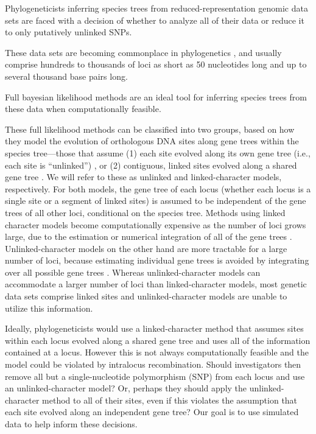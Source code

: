 Phylogeneticists inferring species trees from reduced-representation genomic 
data sets are faced with a decision of whether to analyze all of their data or 
reduce it to only putatively unlinked SNPs.

These data sets are becoming commonplace in phylogenetics \citep{Leache2017}, and
usually comprise hundreds to thousands of loci as short as 50 nucleotides long
and up to several thousand base pairs long. %

Full bayesian likelihood methods are an ideal tool for inferring species trees 
from these data when computationally feasible. 

These full likelihood methods can be classified into two groups, based on how 
they model the evolution of orthologous DNA sites along gene trees within the 
species tree---those that assume (1) each site evolved along its own gene tree 
(i.e., each site is ``unlinked'') 
\citep{bryantInferringSpeciesTrees2012, maioPoMoAlleleFrequencyBased2015}, 
or (2) contiguous, linked sites evolved along a shared gene tree 
\citep{liuSpeciesTreesGene2007, Heled2010, ogilvieStarBEAST2BringsFaster2017, 
yangBPPProgramSpecies2015}. We will refer to these as unlinked and 
linked-character models, respectively. For both models, the gene tree of each 
locus (whether each locus is a single site or a segment of linked sites) 
is assumed to be independent of the gene 
trees of all other loci, conditional on the species tree.
Methods using linked character models become computationally expensive as the
number of loci grows large, due to the estimation or numerical integration of
all of the gene trees \citep{bryantInferringSpeciesTrees2012}.
Unlinked-character models on the other hand are more tractable for a large 
number of loci, because  estimating individual gene trees is avoided by 
integrating over all possible gene trees \citep{bryantInferringSpeciesTrees2012}.
Whereas unlinked-character models can accommodate a larger number of loci than
linked-character models, most genetic data sets comprise linked sites and
unlinked-character models are unable to utilize this information.

Ideally, phylogeneticists would use a linked-character method that assumes sites
within each locus evolved along a shared gene tree and uses all of the information
contained at a locus. However this is not always computationally feasible and 
the model could be violated by intralocus recombination.
Should investigators then remove all but a single-nucleotide
polymorphism (SNP) from each locus and use an unlinked-character model?
Or, perhaps they should apply the unlinked-character method to all of their
sites, even if this violates the assumption that each site evolved along an
independent gene tree?
Our goal is to use simulated data to help inform these decisions.


